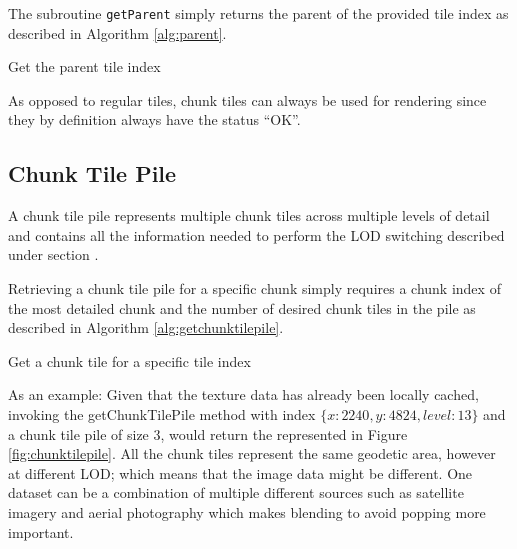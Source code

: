 The subroutine \texttt{getParent} simply returns the parent of the provided tile index as described in Algorithm \ref{alg:parent}.

\begin{algorithm}[htp]
 \caption{Get the parent tile index}
  \label{alg:parent}
\end{algorithm}
\fi

As opposed to regular tiles, chunk tiles can always be used for rendering since they by definition always have the status ``OK''.



\subsection{Chunk Tile Pile}

A chunk tile pile represents multiple chunk tiles across multiple levels of detail and contains all the information needed to perform the LOD switching described under section .


Retrieving a chunk tile pile for a specific chunk simply requires a chunk index of the most detailed chunk and the number of desired chunk tiles in the pile as described in Algorithm \ref{alg:getchunktilepile}.

\begin{algorithm}[htp]
 \caption{Get a chunk tile for a specific tile index}
  \label{alg:getchunktilepile}
\end{algorithm}

As an example: 
Given that the texture data has already been locally cached, invoking the getChunkTilePile method with index $\{x: 2240, y: 4824, level: 13 \}$ and a chunk tile pile of size 3, would return the  represented in Figure \ref{fig:chunktilepile}. All the chunk tiles represent the same geodetic area, however at different LOD; which means that the image data might be different. One dataset can be a combination of multiple different sources such as satellite imagery and aerial photography which makes blending to avoid popping more important.

